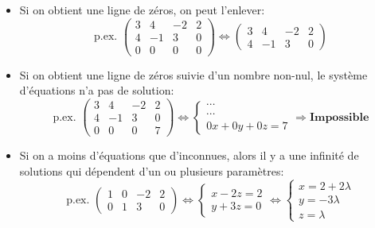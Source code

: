 \begin{remark}
	\begin{itemize}
		\item Si on obtient une ligne de zéros, on peut l'enlever:
		      \[\text{p.ex. }  \left(\begin{array}{ccc|c} 3 & 4 & -2 & 2 \\ 4 & -1 & 3 & 0 \\ 0 & 0 & 0 & 0 \end{array}\right) \Leftrightarrow  \left(\begin{array}{ccc|c} 3 & 4 & -2 & 2 \\ 4 & -1 & 3 & 0 \end{array}\right) \]
		\item Si on obtient une ligne de zéros suivie d'un nombre non-nul, le système d'équations n'a pas de solution:
		      \[\text{p.ex. }  \left(\begin{array}{ccc|c} 3 & 4 & -2 & 2 \\ 4 & -1 & 3 & 0 \\ 0 & 0 & 0 & 7 \end{array}\right) \Leftrightarrow  \begin{cases} \cdots \\ \cdots \\ 0x + 0y + 0z = 7 \end{cases} \Rightarrow \textbf{Impossible} \]
		\item Si on a moins d'équations que d'inconnues, alors il y a une infinité de solutions qui dépendent d'un ou plusieurs paramètres:
		      \[\text{p.ex. }  \left(\begin{array}{ccc|c} 1 & 0 & -2 & 2 \\ 0 & 1 & 3 & 0 \end{array}\right) \Leftrightarrow  \begin{cases} x - 2z = 2 \\ y + 3z = 0 \end{cases} \Leftrightarrow  \begin{cases} x = 2 + 2\lambda \\ y = -3\lambda \\ z = \lambda \end{cases} \]
	\end{itemize}
\end{remark}
